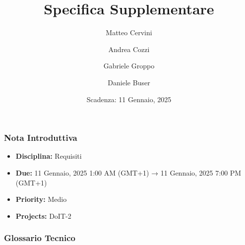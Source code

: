 \title{Specifica Supplementare}
\author{Matteo Cervini \and Andrea Cozzi \and Gabriele Groppo \and Daniele Buser}
\date{Scadenza: 11 Gennaio, 2025}

\maketitle

\subsubsection{Nota Introduttiva}
\begin{itemize}
\item \textbf{Disciplina:} Requisiti
\item \textbf{Due:} 11 Gennaio, 2025 1:00 AM (GMT+1) → 11 Gennaio, 2025 7:00 PM (GMT+1)
\item \textbf{Priority:} Medio
\item \textbf{Projects:} DoIT-2
\end{itemize}

\subsubsection{Glossario Tecnico}

